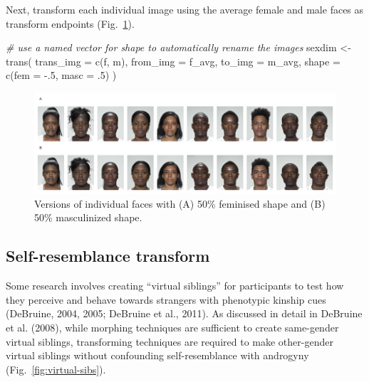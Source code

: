 \documentclass[
  man,floatsintext]{apa6}
\newenvironment{Shaded}{\begin{snugshade}}{\end{snugshade}}
\newcommand{\AttributeTok}[1]{\textcolor[rgb]{0.77,0.63,0.00}{#1}}
\newcommand{\CommentTok}[1]{\textcolor[rgb]{0.56,0.35,0.01}{\textit{#1}}}
\newcommand{\DecValTok}[1]{\textcolor[rgb]{0.00,0.00,0.81}{#1}}
\newcommand{\FunctionTok}[1]{\textcolor[rgb]{0.00,0.00,0.00}{#1}}
\newcommand{\NormalTok}[1]{#1}
\newcommand{\OtherTok}[1]{\textcolor[rgb]{0.56,0.35,0.01}{#1}}
\newcommand{\SpecialCharTok}[1]{\textcolor[rgb]{0.00,0.00,0.00}{#1}}
\begin{document}
Next, transform each individual image using the average female and male faces as transform endpoints (Fig.~\ref{fig:sexdim-transform}).

\begin{Shaded}
\begin{Highlighting}[]
\CommentTok{\# use a named vector for shape to automatically rename the images}
\NormalTok{sexdim }\OtherTok{\textless{}{-}} \FunctionTok{trans}\NormalTok{(}
  \AttributeTok{trans\_img =} \FunctionTok{c}\NormalTok{(f, m),}
  \AttributeTok{from\_img =}\NormalTok{ f\_avg,}
  \AttributeTok{to\_img =}\NormalTok{ m\_avg,}
  \AttributeTok{shape =} \FunctionTok{c}\NormalTok{(}\AttributeTok{fem =} \SpecialCharTok{{-}}\NormalTok{.}\DecValTok{5}\NormalTok{, }\AttributeTok{masc =}\NormalTok{ .}\DecValTok{5}\NormalTok{)}
\NormalTok{)}
\end{Highlighting}
\end{Shaded}



\begin{figure}
\includegraphics[width=1\linewidth]{index_files/figure-latex/sexdim-transform-1} \caption{Versions of individual faces with (A) 50\% feminised shape and (B) 50\% masculinized shape.}\label{fig:sexdim-transform}
\end{figure}

\hypertarget{self-resemblance-transform}{%
\subsection{Self-resemblance transform}\label{self-resemblance-transform}}

Some research involves creating ``virtual siblings'' for participants to test how they perceive and behave towards strangers with phenotypic kinship cues (DeBruine, 2004, 2005; DeBruine et al., 2011). As discussed in detail in DeBruine et al. (2008), while morphing techniques are sufficient to create same-gender virtual siblings, transforming techniques are required to make other-gender virtual siblings without confounding self-resemblance with androgyny (Fig.~\ref{fig:virtual-sibs}).
\end{document}

